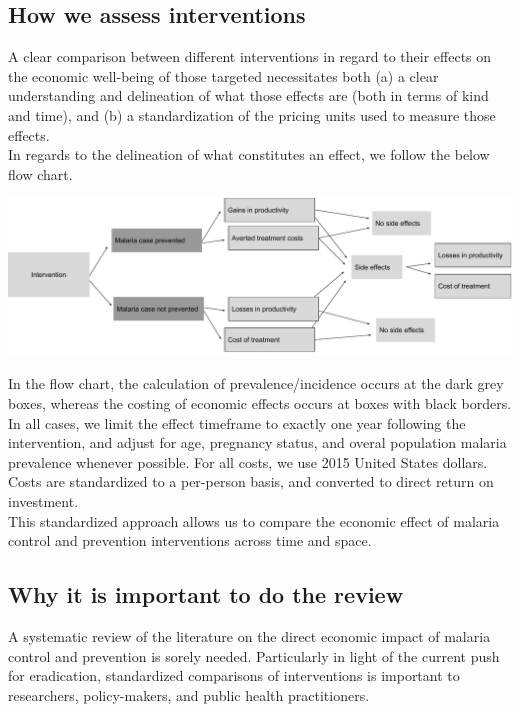 \documentclass{article}
\begin{document}
\subsection*{How we assess interventions}

A clear comparison between different interventions in regard to their effects on the economic well-being of those targeted necessitates both (a) a clear understanding and delineation of what those effects are (both in terms of kind and time), and (b) a standardization of the pricing units used to measure those effects. \\ 

\noindent In regards to the delineation of what constitutes an effect, we follow the below flow chart.

\begin{center}
\includegraphics[width=1\textwidth]{logic_flow.pdf}
\end{center}

\noindent In the flow chart, the calculation of prevalence/incidence occurs at the dark grey boxes, whereas the costing of economic effects occurs at boxes with black borders. In all cases, we limit the effect timeframe to exactly one year following the intervention, and adjust for age, pregnancy status, and overal population malaria prevalence whenever possible. For all costs, we use 2015 United States dollars. Costs are standardized to a per-person basis, and converted to direct return on investment. \\

\noindent This standardized approach allows us to compare the economic effect of malaria control and prevention interventions across time and space.


\subsection*{Why it is important to do the review}

A systematic review of the literature on the direct economic impact of malaria control and prevention is sorely needed. Particularly in light of the current push for eradication, standardized comparisons of interventions is important to researchers, policy-makers, and public health practitioners. \\
\end{document}
